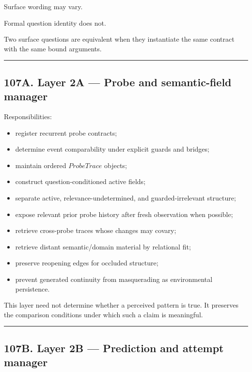 \documentclass[
]{article}
\providecommand{\tightlist}{%
  \setlength{\itemsep}{0pt}\setlength{\parskip}{0pt}}
\begin{document}
Surface wording may vary.

Formal question identity does not.

Two surface questions are equivalent when they instantiate the same
contract with the same bound arguments.

\begin{center}\rule{0.5\linewidth}{0.5pt}\end{center}


\subsection{107A. Layer 2A --- Probe and semantic-field
manager}\label{layer-2a-probe-and-semantic-field-manager}

Responsibilities:

\begin{itemize}
\tightlist
\item register recurrent probe contracts;
\item determine event comparability under explicit guards and bridges;
\item maintain ordered \(ProbeTrace\) objects;
\item construct question-conditioned active fields;
\item separate active, relevance-undetermined, and guarded-irrelevant structure;
\item expose relevant prior probe history after fresh observation when possible;
\item retrieve cross-probe traces whose changes may covary;
\item retrieve distant semantic/domain material by relational fit;
\item preserve reopening edges for occluded structure;
\item prevent generated continuity from masquerading as environmental persistence.
\end{itemize}

This layer need not determine whether a perceived pattern is true. It preserves
the comparison conditions under which such a claim is meaningful.

\begin{center}\rule{0.5\linewidth}{0.5pt}\end{center}


\subsection{107B. Layer 2B --- Prediction and attempt
manager}\label{layer-2b-prediction-and-attempt-manager}
\end{document}
